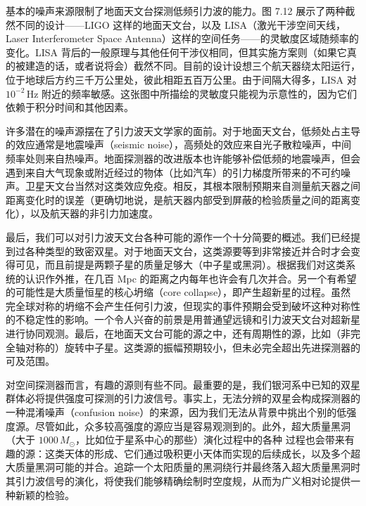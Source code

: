 基本的噪声来源限制了地面天文台探测低频引力波的能力。图 7.12 展示了两种截然不同的设计——LIGO 这样的地面天文台，以及 LISA（激光干涉空间天线，Laser Interferometer Space Antenna）这样的空间任务——的灵敏度区域随频率的变化。LISA 背后的一般原理与其他任何干涉仪相同，但其实施方案则（如果它真的被建造的话，或者说将会）截然不同。目前的设计设想三个航天器绕太阳运行，位于地球后方约三千万公里处，彼此相距五百万公里。由于间隔大得多，LISA 对 $10^{-2}\,\mathrm{Hz}$ 附近的频率敏感。这张图中所描绘的灵敏度只能视为示意性的，因为它们依赖于积分时间和其他因素。

许多潜在的噪声源摆在了引力波天文学家的面前。对于地面天文台，低频处占主导的效应通常是地震噪声（seismic noise），高频处的效应来自光子散粒噪声，中间频率处则来自热噪声。地面探测器的改进版本也许能够补偿低频的地震噪声，但会遇到来自大气现象或附近经过的物体（比如汽车）的引力梯度所带来的不可约噪声。卫星天文台当然对这类效应免疫。相反，其根本限制预期来自测量航天器之间距离变化时的误差（更确切地说，是航天器内部受到屏蔽的检验质量之间的距离变化），以及航天器的非引力加速度。



最后，我们可以对引力波天文台各种可能的源作一个十分简要的概述。我们已经提到过各种类型的致密双星。对于地面天文台，这类源要等到非常接近并合时才会变得可见，而且前提是两颗子星的质量足够大（中子星或黑洞）。根据我们对这类系统的认识作外推，在几百 Mpc 的距离之内每年也许会有几次并合。另一个有希望的可能性是大质量恒星的核心坍缩（core collapse），即产生超新星的过程。虽然完全球对称的坍缩不会产生任何引力波，但现实的事件预期会受到破坏这种对称性的不稳定性的影响。一个令人兴奋的前景是用普通望远镜和引力波天文台对超新星进行协同观测。最后，在地面天文台可能的源之中，还有周期性的源，比如（非完全轴对称的）旋转中子星。这类源的振幅预期较小，但未必完全超出先进探测器的可及范围。

对空间探测器而言，有趣的源则有些不同。最重要的是，我们银河系中已知的双星群体必将提供强度可探测的引力波信号。事实上，无法分辨的双星会构成探测器的一种混淆噪声（confusion noise）的来源，因为我们无法从背景中挑出个别的低强度源。尽管如此，众多较高强度的源应当是容易观测到的。此外，超大质量黑洞（大于 $1000\,M_\odot$，比如位于星系中心的那些）演化过程中的各种
过程也会带来有趣的源：这类天体的形成、它们通过吸积更小天体而实现的后续成长，以及多个超大质量黑洞可能的并合。追踪一个太阳质量的黑洞绕行并最终落入超大质量黑洞时其引力波信号的演化，将使我们能够精确绘制时空度规，从而为广义相对论提供一种新颖的检验。

